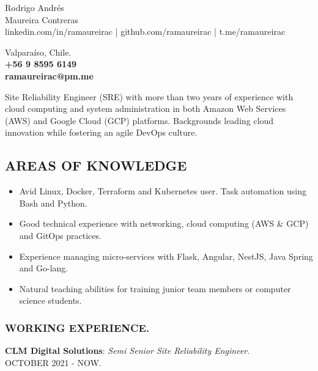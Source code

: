 \documentclass[11pt]{article}
\begin{document}
\thispagestyle{empty}
\setmainfont{Arial}


\noindent
\begin{minipage}[ht]{0.64\linewidth}

{\Huge Rodrigo Andrés\\ Maureira Contreras}\\
{\footnotesize linkedin.com/in/ramaureirac | github.com/ramaureirac | t.me/ramaureirac}

\end{minipage}
\hspace{22mm}
\noindent
\begin{minipage}[ht]{0.22\linewidth}
Valparaíso, Chile.\\
\textbf{+56 9 8595 6149\\
ramaureirac@pm.me}

\end{minipage}


\vspace{5mm}


\noindent
Site Reliability Engineer (SRE) with more than two years of experience with cloud computing and system administration in both Amazon Web Services (AWS) and Google Cloud (GCP) platforms. Backgrounds leading cloud innovation while fostering an agile DevOps culture.


\subsection*{AREAS OF KNOWLEDGE}
\begin{itemize}
    \item[1.] Avid Linux, Docker, Terraform and Kubernetes user. Task automation using Bash and Python.
    \item[2.] Good technical experience with networking, cloud computing (AWS \& GCP) and GitOps practices.
    \item[3.] Experience managing micro-services with Flask, Angular, NestJS, Java Spring and Go-lang.
    \item[4.] Natural teaching abilities for training junior team members or computer science students.
\end{itemize}


\subsubsection*{WORKING EXPERIENCE.}


\noindent
\textbf{CLM Digital Solutions}: \textit{Semi Senior Site Reliability Engineer}.\\
{\footnotesize OCTOBER 2021 - NOW.}
\end{document}
